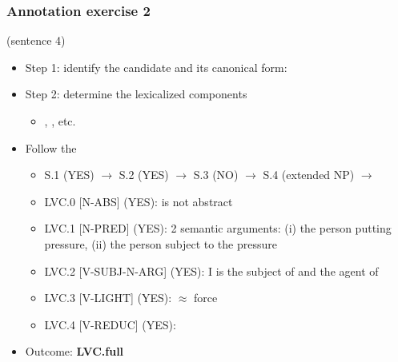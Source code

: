 \documentclass[xcolor=dvipsnames]{beamer}
\begin{document}
\begin{frame} 
\frametitle{Annotation exercise 2}

 (sentence 4)

\begin{scriptsize}
\begin{block}{}
\begin{itemize}
\item Step 1: identify the candidate and its canonical form: 
\item Step 2: determine the lexicalized components
   \begin{itemize}
   \item {}, , etc.
   \end{itemize}
\item Follow the \href{http://parsemefr.lif.univ-mrs.fr/parseme-st-guidelines/1.3/?page=040\_Annotation\_process\_-\_decision\_tree}{}
   \begin{itemize}
   \item S.1 (YES) $\rightarrow$ S.2 (YES) $\rightarrow$ S.3 (NO) $\rightarrow$ S.4 (extended NP) $\rightarrow$
   \item LVC.0 [N-ABS] (YES):  is not abstract
   \item LVC.1 [N-PRED] (YES): 2 semantic arguments: (i) the person putting pressure, (ii) the person subject to the pressure
   \item LVC.2 [V-SUBJ-N-ARG] (YES): I is the subject of  and the agent of  
   \item LVC.3 [V-LIGHT] (YES):  $\approx$ force
   \item LVC.4 [V-REDUC] (YES): 
   \end{itemize}
\item Outcome: \textbf{LVC.full}
\end{itemize}
\end{block}

\end{scriptsize}

\end{frame}
\end{document}

